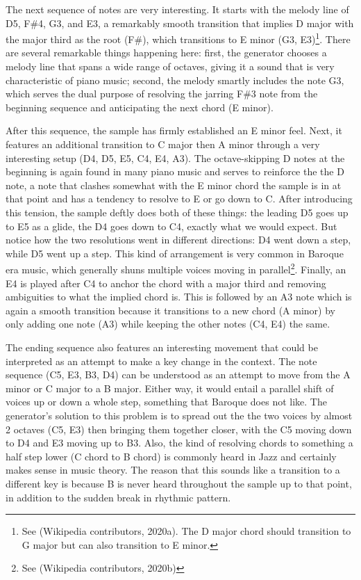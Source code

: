 \documentclass[12pt,oneside]{chicagocapstone}
\begin{document}
The next sequence of notes are very interesting. It starts with the melody line of D5, F\#4, G3, and E3, a remarkably smooth transition that implies D major with the major third as the root (F\#), which transitions to E minor (G3, E3)\footnote{See (Wikipedia contributors, 2020a). The D major chord should transition to G major but can also transition to E minor.}. There are several remarkable things happening here: first, the generator chooses a melody line that spans a wide range of octaves, giving it a sound that is very characteristic of piano music; second, the melody smartly includes the note G3, which serves the dual purpose of resolving the jarring F\#3 note from the beginning sequence and anticipating the next chord (E minor).

After this sequence, the sample has firmly established an E minor feel. Next, it features an additional transition to C major then A minor through a very interesting setup (D4, D5, E5, C4, E4, A3). The octave-skipping D notes at the beginning is again found in many piano music and serves to reinforce the the D note, a note that clashes somewhat with the E minor chord the sample is in at that point and has a tendency to resolve to E or go down to C. After introducing this tension, the sample deftly does both of these things: the leading D5 goes up to E5 as a glide, the D4 goes down to C4, exactly what we would expect. But notice how the two resolutions went in different directions: D4 went down a step, while D5 went up a step. This kind of arrangement is very common in Baroque era music, which generally shuns multiple voices moving in parallel\footnote{See (Wikipedia contributors, 2020b)}. Finally, an E4 is played after C4 to anchor the chord with a major third and removing ambiguities to what the implied chord is. This is followed by an A3 note which is again a smooth transition because it transitions to a new chord (A minor) by only adding one note (A3) while keeping the other notes (C4, E4) the same.

The ending sequence also features an interesting movement that could be interpreted as an attempt to make a key change in the context. The note sequence (C5, E3, B3, D4) can be understood as an attempt to move from the A minor or C major to a B major. Either way, it would entail a parallel shift of voices up or down a whole step, something that Baroque does not like. The generator's solution to this problem is to spread out the the two voices by almost 2 octaves (C5, E3) then bringing them together closer, with the C5 moving down to D4 and E3 moving up to B3. Also, the kind of resolving chords to something a half step lower (C chord to B chord) is commonly heard in Jazz and certainly makes sense in music theory. The reason that this sounds like a transition to a different key is because B is never heard throughout the sample up to that point, in addition to the sudden break in rhythmic pattern.
\end{document}
